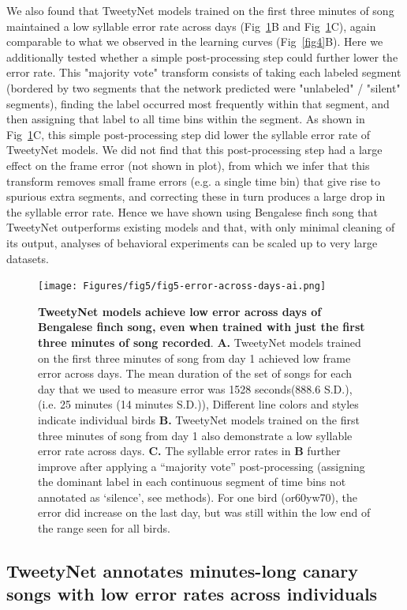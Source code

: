 \documentclass[10pt,letterpaper]{article}
\begin{document}
We also found that TweetyNet models trained on the first three minutes of song 
maintained a low syllable error rate across days (Fig~\ref{fig5}B and Fig~\ref{fig5}C), 
again comparable to what we observed in the learning curves (Fig~\ref{fig4}B).
Here we additionally tested whether a simple post-processing step could 
further lower the error rate. This "majority vote" transform consists of 
taking each labeled segment (bordered by two segments that the network 
predicted were "unlabeled" / "silent" segments), finding the label 
occurred most frequently within that segment, and then assigning that 
label to all time bins within the segment.
As shown in Fig~\ref{fig5}C, this simple post-processing step 
did lower the syllable error rate of TweetyNet models.
We did not find that this post-processing step had a large effect on the 
frame error (not shown in plot), from which we infer that this 
transform removes small frame errors (e.g. a single time bin) that give 
rise to spurious extra segments, 
and correcting these in turn produces a large drop in the syllable error rate.
Hence we have shown using Bengalese finch song 
that TweetyNet outperforms existing models and that, 
with only minimal cleaning of its output, analyses of behavioral experiments 
can be scaled up to very large datasets.

\begin{figure}[!ht]
\texttt{[image: Figures/fig5/fig5-error-across-days-ai.png]}
\caption{{\bf TweetyNet models achieve low error across days of Bengalese finch song, 
even when trained with just the first three minutes of song recorded}.
\textbf{A.} TweetyNet models trained on the first three minutes of song 
from day 1 achieved low frame error across days.
The mean duration of the set of songs for each day 
that we used to measure error was 1528 seconds(888.6 S.D.), 
(i.e. 25 minutes (14 minutes S.D.)),
Different line colors and styles indicate individual birds
\textbf{B.} TweetyNet models trained on the first three minutes of song 
from day 1 also demonstrate a low syllable error rate across days.
\textbf{C.}  The syllable error rates in \textbf{B} further improve 
after applying a “majority vote” post-processing 
(assigning the dominant label in each continuous segment of time bins 
not annotated as ‘silence’, see methods).
For one bird (or60yw70), the error did increase on the last day, 
but was still within the low end of the range seen for all birds.
}
\label{fig5}
\end{figure}

\subsection*{TweetyNet annotates minutes-long canary songs with low error rates across individuals}
\end{document}
